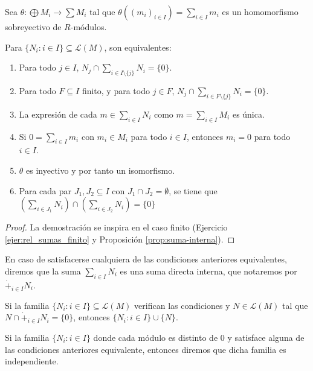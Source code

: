 \begin{lema}
  Sea \(\theta:\bigoplus M_i\longrightarrow \sum M_i\) tal que
  \(\theta({(m_i)}_{i\in I})=\sum_{i\in I} m_i\) es un homomorfismo
  sobreyectivo de \(R\)-módulos.

  Para \(\{N_i:i\in I\}\subseteq\mathcal{L}(M)\), son equivalentes:
  \begin{enumerate}
    \item Para todo \(j\in I\), \(N_j\cap\sum_{i\in I\setminus\{j\}} N_i
      =\{0\}\).
    \item Para todo \(F\subseteq I\) finito, y para todo \(j\in F\),
      \(N_j\cap\sum_{i\in F\setminus\{j\}} N_i
      =\{0\}\).
    \item La expresión de cada \(m \in \sum_{i \in I} N_i\) como \(m =
      \sum_{i \in I}M_i\) es única.
    \item Si \(0=\sum_{i\in I} m_i\) con \(m_i\in M_i\) para todo
      \(i\in I\), entonces \(m_i=0\) para todo \(i\in I\).
    \item \(\theta\) es inyectivo y por tanto un isomorfismo.
    \item Para cada par \(J_1,J_2\subseteq I\) con
      \(J_1\cap J_2=\emptyset\), se tiene que
      \(\left(\sum_{i\in J_1} N_i\right)\cap
      \left(\sum_{i\in J_2} N_i\right)=\{0\}\)
  \end{enumerate}
\end{lema}
\begin{proof}
  La demostración se inspira en el caso finito (Ejercicio \ref{ejer:rel_sumas_finito}
  y Proposición \ref{prop:suma-interna}).
\end{proof}

\begin{df}
  En caso de satisfacerse cualquiera de las condiciones anteriores
  equivalentes, diremos que la suma \(\sum_{i\in I} N_i\) es una suma
  directa interna, que notaremos por \(\dot{+}_{i\in I} N_i\).
\end{df}

\begin{cor}
  Si la familia \(\{N_i:i\in I\}\subseteq\mathcal{L}(M)\) verifican
  las condiciones y \(N\in\mathcal{L}(M)\) tal que
  \(N\cap\dot{+}_{i\in I} N_i=\{0\}\), entonces \(\{N_i:i\in I\}\cup\{N\}\).
\end{cor}

\begin{df}[Independencia]
  Si la familia \(\{N_i:i\in I\}\) donde cada módulo es distinto de 0 y
  satisface alguna de las condiciones anteriores equivalente, entonces
  diremos que dicha familia es independiente.
\end{df}

